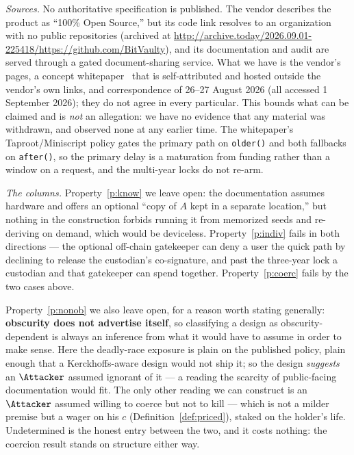 \begin{remark}\label{rem:bitvault}
\emph{Sources.} No authoritative specification is published. The vendor describes
the product as ``100\% Open Source,'' but its code link resolves to an
organization with no public repositories (archived at
\url{http://archive.today/2026.09.01-225418/https://github.com/BitVaulty}), and its documentation and audit are served
through a gated document-sharing service. What we have is the vendor's pages, a
concept whitepaper~\cite{bssl} that is self-attributed and hosted outside the
vendor's own links, and correspondence of 26--27 August 2026 (all accessed
1 September 2026); they do not agree in every particular. This bounds what can be
claimed and is \emph{not} an allegation: we have no evidence that any material was
withdrawn, and observed none at any earlier time. The whitepaper's
Taproot/Miniscript policy gates the primary path on \texttt{older()} and both
fallbacks on \texttt{after()}, so the primary delay is a maturation from funding
rather than a window on a request, and the multi-year locks do not re-arm.

\emph{The columns.} Property~\ref{p:know} we leave open: the documentation assumes
hardware and offers an optional ``copy of $A$ kept in a separate location,'' but
nothing in the construction forbids running it from memorized seeds and
re-deriving on demand, which would be deviceless. Property~\ref{p:indiv} fails in
both directions --- the optional off-chain gatekeeper can deny a user the quick
path by declining to release the custodian's co-signature, and past the three-year
lock a custodian and that gatekeeper can spend together. Property~\ref{p:coerc}
fails by the two cases above.

Property~\ref{p:nonob} we also leave open, for a reason worth stating generally:
\textbf{obscurity does not advertise itself}, so classifying a design as
obscurity-dependent is always an inference from what it would have to assume in
order to make sense. Here the deadly-race exposure is plain on the published
policy, plain enough that a Kerckhoffs-aware design would not ship it; so the
design \emph{suggests} an $\Attacker$ assumed ignorant of it --- a reading the
scarcity of public-facing documentation would fit. The only other
reading we can construct is an $\Attacker$ assumed willing to coerce but not to
kill --- which is not a milder premise but a wager on his $c$
(Definition~\ref{def:priced}), staked on the holder's life. Undetermined is the
honest entry between the two, and it costs nothing: the coercion result stands on
structure either way.
\end{remark}

